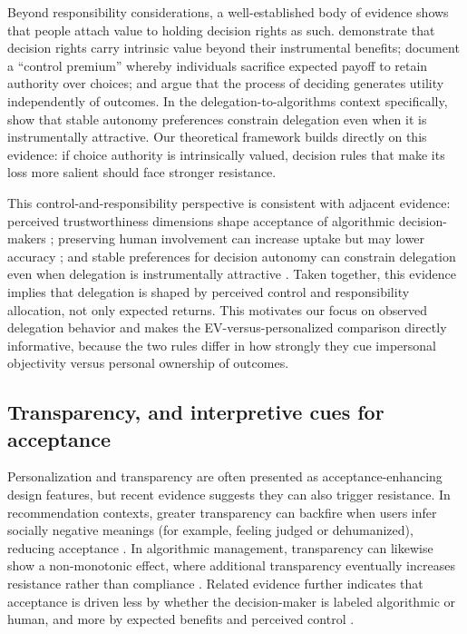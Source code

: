 \documentclass[a4paper, 12pt, fleqn]{article}
\theoremstyle{definition}
\begin{document}
Beyond responsibility considerations, a well-established body of evidence shows that people attach value to holding decision rights as such. \citet{Bartling2014} demonstrate that decision rights carry intrinsic value beyond their instrumental benefits; \citet{Owens2014} document a ``control premium'' whereby individuals sacrifice expected payoff to retain authority over choices; and \citet{FreyBenzStutzer2004} argue that the process of deciding generates utility independently of outcomes. In the delegation-to-algorithms context specifically, \citet{Ivanova-Stenzel2025} show that stable autonomy preferences constrain delegation even when it is instrumentally attractive. Our theoretical framework builds directly on this evidence: if choice authority is intrinsically valued, decision rules that make its loss more salient should face stronger resistance.

This control-and-responsibility perspective is consistent with adjacent evidence: perceived trustworthiness dimensions shape acceptance of algorithmic decision-makers \citep{Hoeddinghaus2021}; preserving human involvement can increase uptake but may lower accuracy \citep{Sele2024}; and stable preferences for decision autonomy can constrain delegation even when delegation is instrumentally attractive \citep{Ivanova-Stenzel2025}. Taken together, this evidence implies that delegation is shaped by perceived control and responsibility allocation, not only expected returns. This motivates our focus on observed delegation behavior and makes the EV-versus-personalized comparison directly informative, because the two rules differ in how strongly they cue impersonal objectivity versus personal ownership of outcomes.

\subsection{Transparency, and interpretive cues for acceptance}
Personalization and transparency are often presented as acceptance-enhancing design features, but recent evidence suggests they can also trigger resistance. In recommendation contexts, greater transparency can backfire when users infer socially negative meanings (for example, feeling judged or dehumanized), reducing acceptance \citep{Chen2024}. In algorithmic management, transparency can likewise show a non-monotonic effect, where additional transparency eventually increases resistance rather than compliance \citep{Hu2024}. Related evidence further indicates that acceptance is driven less by whether the decision-maker is labeled algorithmic or human, and more by expected benefits and perceived control \citep{Schaap2024}.
\end{document}
